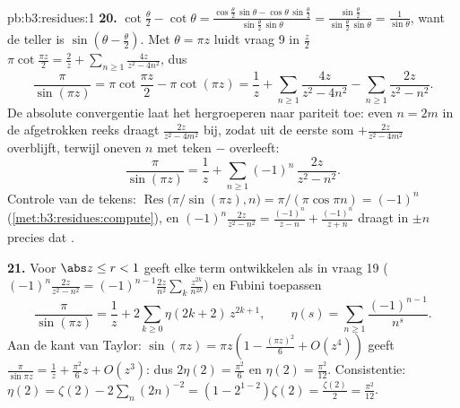 \begin{solution}{pb:b3:residues:1}
\textbf{20.} $\cot\frac\theta2 - \cot\theta =
\frac{\cos\frac\theta2\,\sin\theta -
\cos\theta\,\sin\frac\theta2}{\sin\frac\theta2\,\sin\theta} =
\frac{\sin\frac\theta2}{\sin\frac\theta2\,\sin\theta} =
\frac1{\sin\theta}$, want de teller is $\sin(\theta -
\frac\theta2)$. Met $\theta = \pi z$ luidt vraag 9 in $\frac z2$
$\pi\cot\frac{\pi z}2 = \frac2z + \sum_{n\geq1}\frac{4z}{z^2 -
4n^2}$, dus
\[
\frac{\pi}{\sin(\pi z)}
= \pi\cot\frac{\pi z}2 - \pi\cot(\pi z)
= \frac1z + \sum_{n\geq1}\frac{4z}{z^2 - 4n^2}
- \sum_{n\geq1}\frac{2z}{z^2 - n^2} .
\]
De absolute convergentie laat het hergroeperen naar pariteit toe:
even $n = 2m$ in de afgetrokken reeks draagt
$\frac{2z}{z^2-4m^2}$ bij, zodat uit de eerste som
$+\frac{2z}{z^2-4m^2}$ overblijft, terwijl oneven $n$ met teken
$-$ overleeft:
\[
\frac{\pi}{\sin(\pi z)} = \frac1z +
\sum_{n\geq1}(-1)^n\,\frac{2z}{z^2 - n^2} .
\]
Controle van de tekens: $\operatorname{Res}\bigl(\pi/\sin(\pi z),
n\bigr) = \pi/(\pi\cos\pi n) = (-1)^n$
(\cref{met:b3:residues:compute}), en $(-1)^n\frac{2z}{z^2 - n^2}
= \frac{(-1)^n}{z-n} + \frac{(-1)^n}{z+n}$ draagt in $\pm n$
precies dat .

\textbf{21.} Voor $\abs z \leq r < 1$ geeft elke term ontwikkelen
als in vraag 19 ($(-1)^n\frac{2z}{z^2-n^2} =
(-1)^{n-1}\frac{2z}{n^2}\sum_k\frac{z^{2k}}{n^{2k}}$) en Fubini
toepassen
\[
\frac{\pi}{\sin(\pi z)} = \frac1z +
2\sum_{k\geq0}\eta(2k+2)\,z^{2k+1},
\qquad
\eta(s) = \sum_{n\geq1}\frac{(-1)^{n-1}}{n^s} .
\]
Aan de kant van Taylor: $\sin(\pi z) = \pi z(1 - \frac{(\pi
z)^2}6 + O(z^4))$ geeft $\frac\pi{\sin\pi z} = \frac1z +
\frac{\pi^2}6z + O(z^3)$: dus $2\eta(2) = \frac{\pi^2}6$ en
$\eta(2) = \frac{\pi^2}{12}$. Consistentie: $\eta(2) = \zeta(2) -
2\sum_n(2n)^{-2} = (1 - 2^{1-2})\zeta(2) = \frac{\zeta(2)}2 =
\frac{\pi^2}{12}$.


\end{solution}
